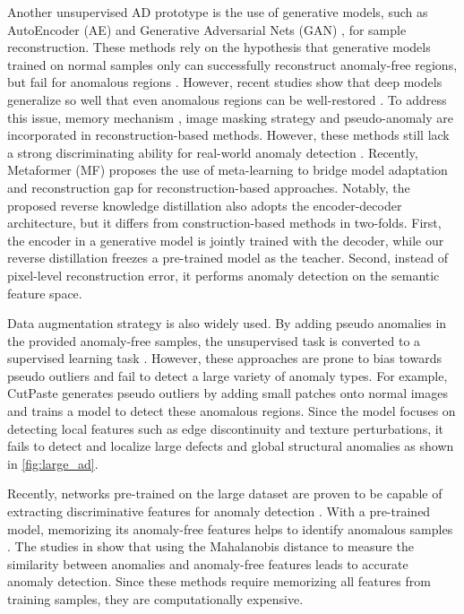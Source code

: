 \documentclass[10pt,twocolumn,letterpaper]{article}
\begin{document}
Another unsupervised AD prototype is the use of generative models, such as AutoEncoder (AE) \cite{vae} and Generative Adversarial Nets (GAN) \cite{gan}, for sample reconstruction. These methods rely on the hypothesis that generative models trained on normal samples only can successfully reconstruct anomaly-free regions, but fail for anomalous regions \cite{ssimae,fanogan,gn}. However, recent studies show that deep models generalize so well that even anomalous regions can be well-restored \cite{riad}. To address this issue, memory mechanism \cite{memae,mnad,daad} , image masking strategy \cite{scadn,riad} and pseudo-anomaly \cite{oig,g2d} are incorporated in reconstruction-based methods. However, these methods still lack a strong discriminating ability for real-world anomaly detection \cite{ssimae, mvtec}. Recently, Metaformer (MF) \cite{mf} proposes the use of meta-learning \cite{meta} to bridge model adaptation and reconstruction gap for reconstruction-based approaches. Notably, the proposed reverse knowledge distillation also adopts the encoder-decoder architecture, but it differs from construction-based methods in two-folds. First, the encoder in a generative model is jointly trained with the decoder, while our reverse distillation freezes a pre-trained model as the teacher. Second, instead of pixel-level reconstruction error, it performs anomaly detection on the semantic feature space.


Data augmentation strategy is also widely used. By adding pseudo anomalies in the provided anomaly-free samples, the unsupervised task is converted to a supervised learning task \cite{cutpaste,scadn,riad}. However, these approaches are prone to bias towards pseudo outliers and fail to detect a large variety of anomaly types. For example, CutPaste \cite{cutpaste} generates pseudo outliers by adding small patches onto normal images and trains a model to detect these anomalous regions. Since the model focuses on detecting local features such as edge discontinuity and texture perturbations, it fails to detect and localize large defects and global structural anomalies as shown in \cref{fig:large_ad}.

Recently, networks pre-trained on the large dataset are proven to be capable of extracting discriminative features for anomaly detection \cite{pretrain,spade,padim,panda,cutpaste,GAD}. With a pre-trained model, memorizing its anomaly-free features helps to identify anomalous samples \cite{spade,panda}. The studies in \cite{padim,GAD} show that using the Mahalanobis distance to measure the similarity between anomalies and anomaly-free features leads to accurate anomaly detection. Since these methods require memorizing all features from training samples, they are computationally expensive. 
\end{document}
